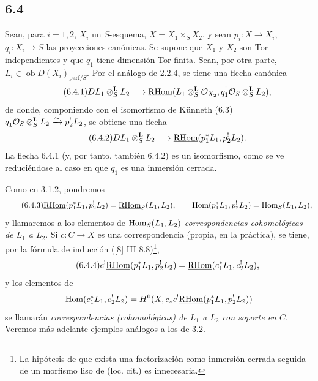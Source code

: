 \subsection*{6.4}
Sean, para $i=1,2$, $X_i$ un $S$-esquema, $X=X_1\times_SX_2$, y sean $p_i:X\to X_i$, $q_i:X_i\to S$ las proyecciones canónicas. Se supone que $X_1$ y $X_2$ son Tor-independientes y que $q_1$ tiene dimensión Tor finita. Sean, por otra parte, $L_i\in\operatorname{ob}D(X_i)_{\mathrm{parf}/S}$. Por el análogo de 2.2.4, se tiene una flecha canónica
\begin{equation}
\tag{6.4.1}
DL_1\otimes_S^{\mathbf L}L_2\longrightarrow \underline{\mathrm{RHom}}(L_1\otimes_S^{\mathbf L}\mathcal{O}_{X_2},q_1^!\mathcal{O}_S\otimes_S^{\mathbf L}L_2),
\end{equation}
de donde, componiendo con el isomorfismo de Künneth (6.3) $q_1^!\mathcal{O}_S\otimes_S^{\mathbf L}L_2\xrightarrow{\sim}p_2^!L_2$, se obtiene una flecha
\begin{equation}
\tag{6.4.2}
DL_1\otimes_S^{\mathbf L}L_2\longrightarrow\underline{\mathrm{RHom}}(p_1^*L_1,p_2^!L_2).
\end{equation}
La flecha 6.4.1 (y, por tanto, también 6.4.2) es un isomorfismo, como se ve reduciéndose al caso en que $q_1$ es una inmersión cerrada.

Como en 3.1.2, pondremos
\begin{equation}
\tag{6.4.3}
\underline{\mathrm{RHom}}(p_1^*L_1,p_2^!L_2)=\underline{\mathrm{RHom}}_S(L_1,L_2),\qquad
\operatorname{Hom}(p_1^*L_1,p_2^!L_2)=\operatorname{Hom}_S(L_1,L_2),
\end{equation}
y llamaremos a los elementos de $\operatorname{Hom}_S(L_1,L_2)$ \emph{correspondencias cohomológicas de $L_1$ a $L_2$}. Si $c:C\to X$ es una correspondencia (propia, en la práctica), se tiene, por la fórmula de inducción ([8] III 8.8)\footnote{La hipótesis de que exista una factorización como inmersión cerrada seguida de un morfismo liso de (loc. cit.) es innecesaria.},
\begin{equation}
\tag{6.4.4}
c^!\underline{\mathrm{RHom}}(p_1^*L_1,p_2^!L_2)=\underline{\mathrm{RHom}}(c_1^*L_1,c_2^!L_2),
\end{equation}
y los elementos de
\[
\operatorname{Hom}(c_1^*L_1,c_2^!L_2)=H^0(X,c_*c^!\underline{\mathrm{RHom}}(p_1^*L_1,p_2^!L_2))
\]
se llamarán \emph{correspondencias (cohomológicas) de $L_1$ a $L_2$ con soporte en $C$}. Veremos más adelante ejemplos análogos a los de 3.2.

